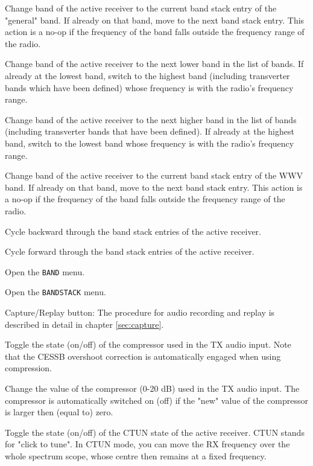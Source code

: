\documentclass[12pt]{book}
\begin{document}
{Change band of the active receiver to the current band stack entry of the "general" band. If already on that
band, move to
the next band stack entry. This action is a no-op if the frequency of the band falls outside the frequency
range of the radio.}

{Change band of the active receiver to the next lower band in the list of bands. If already at the lowest
band, switch to the highest band (including transverter bands which have been defined) whose frequency is
with the radio's frequency range.}

{Change band of the active receiver to the next higher band in the list of bands (including transverter
bands that have been defined). If already at the highest band, switch to the lowest band whose frequency is
with the radio's frequency range.}

{Change band of the active receiver to the current band stack entry of the WWV band. If already on that band,
move to the next band stack entry. This action is a no-op if the frequency of the band falls outside the
frequency range of the radio.}

{Cycle backward through the band stack entries of the active receiver.}

{Cycle forward through the band stack entries of the active receiver.}

{Open the \texttt{BAND} menu.}

{Open the \texttt{BANDSTACK} menu.}

{Capture/Replay button: The procedure for audio recording and replay is described
in detail in chapter \ref{sec:capture}.}

{Toggle the state (on/off) of the compressor used in the TX audio input. Note that the CESSB overshoot
correction is automatically engaged when using compression.}

{Change the value of the compressor (0-20 dB) used in the TX audio input. The compressor is automatically
switched on (off) if the "new" value of the compressor is larger then  (equal to) zero.}

{Toggle the state (on/off) of the CTUN state of the active receiver. CTUN stands for "click to tune". In
CTUN mode, you can move
the RX frequency over the whole spectrum scope, whose centre then remains at a fixed frequency.}
\end{document}
